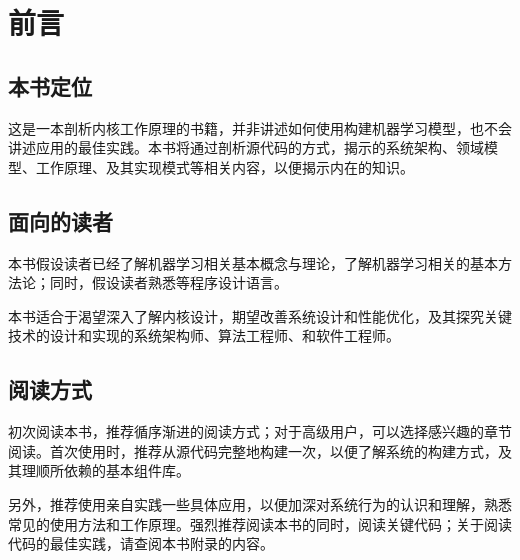 \chapter{前言} 
\label{ch:preface}

\section*{本书定位}

\begin{content}

这是一本剖析内核工作原理的书籍，并非讲述如何使用构建机器学习模型，也不会讲述应用的最佳实践。本书将通过剖析源代码的方式，揭示的系统架构、领域模型、工作原理、及其实现模式等相关内容，以便揭示内在的知识。

\end{content}


\section*{面向的读者}

\begin{content}

本书假设读者已经了解机器学习相关基本概念与理论，了解机器学习相关的基本方法论；同时，假设读者熟悉等程序设计语言。

本书适合于渴望深入了解内核设计，期望改善系统设计和性能优化，及其探究关键技术的设计和实现的系统架构师、算法工程师、和软件工程师。

\end{content}

\section*{阅读方式}

\begin{content}

初次阅读本书，推荐循序渐进的阅读方式；对于高级用户，可以选择感兴趣的章节阅读。首次使用时，推荐从源代码完整地构建一次，以便了解系统的构建方式，及其理顺所依赖的基本组件库。

另外，推荐使用亲自实践一些具体应用，以便加深对系统行为的认识和理解，熟悉常见的使用方法和工作原理。强烈推荐阅读本书的同时，阅读关键代码；关于阅读代码的最佳实践，请查阅本书附录的内容。

\end{content}

